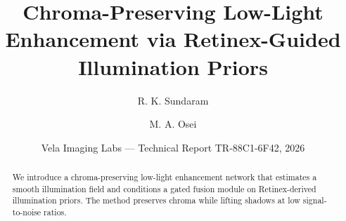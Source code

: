 \documentclass[11pt]{article}
\title{Chroma-Preserving Low-Light Enhancement via Retinex-Guided Illumination Priors}
\author{R. K. Sundaram \and M. A. Osei}
\date{Vela Imaging Labs --- Technical Report TR-88C1-6F42, 2026}
\begin{document}
\maketitle
\begin{abstract}
We introduce a chroma-preserving low-light enhancement network that estimates a
smooth illumination field and conditions a gated fusion module on Retinex-derived
illumination priors. The method preserves chroma while lifting shadows at low
signal-to-noise ratios.
\end{abstract}



\end{document}
